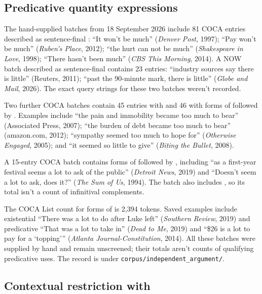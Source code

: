 \documentclass[12pt]{article}
\begin{document}
\subsection{Predicative quantity expressions}

The hand-supplied batches from 18 September 2026 include 81 COCA entries described as sentence-final : \enquote{It won't be much} (\textit{Denver Post}, 1997); \enquote{Pay won't be much} (\textit{Ruben's Place}, 2012); \enquote{the hurt can not be much} (\textit{Shakespeare in Love}, 1998); \enquote{There hasn't been much} (\textit{CBS This Morning}, 2014). A NOW batch described as sentence-final  contains 23 entries: \enquote{industry sources say there is little} (Reuters, 2011); \enquote{past the 90-minute mark, there is little} (\textit{Globe and Mail}, 2026). The exact query strings for these two batches weren't recorded.

Two further COCA batches contain 45 entries with  and 46 with forms of  followed by . Examples include \enquote{the pain and immobility became too much to bear} (Associated Press, 2007); \enquote{the burden of debt became too much to bear} (amazon.com, 2012); \enquote{sympathy seemed too much to hope for} (\textit{Otherwise Engaged}, 2005); and \enquote{it seemed so little to give} (\textit{Biting the Bullet}, 2008).

A 15-entry COCA batch contains forms of  followed by , including \enquote{as a first-year festival seems a lot to ask of the public} (\textit{Detroit News}, 2019) and \enquote{Doesn't seem a lot to ask, does it?} (\textit{The Sum of Us}, 1994). The batch also includes , so its total isn't a count of infinitival complements.

The COCA List count for forms of  is 2,394 tokens. Saved examples include existential \enquote{There was a lot to do after Luke left} (\textit{Southern Review}, 2019) and predicative \enquote{That was a lot to take in} (\textit{Dead to Me}, 2019) and \enquote{\$26 is a lot to pay for a \enquote{topping}} (\textit{Atlanta Journal-Constitution}, 2014). All these batches were supplied by hand and remain unscreened; their totals aren't counts of qualifying predicative uses. The record is under \texttt{corpus/independent\_argument/}.

\subsection{Contextual restriction with }
\end{document}

